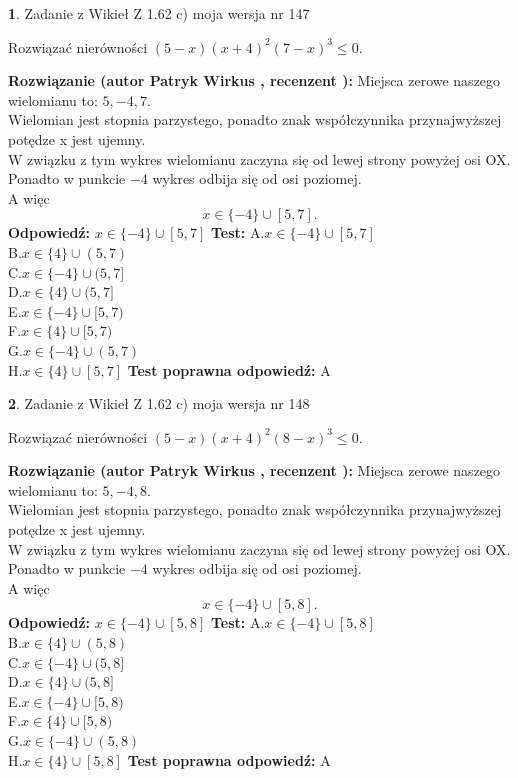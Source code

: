 \documentclass[12pt, a4paper]{article}
\theoremstyle{definition} %
\newtheorem{zad}{}
\newcommand{\zadStart}[1]{\begin{zad}#1\newline}
\newcommand{\zadStop}{\end{zad}}
\newcommand{\rozwStart}[2]{\noindent \textbf{Rozwiązanie (autor #1 , recenzent #2): }\newline}
\newcommand{\rozwStop}{\newline}
\newcommand{\odpStart}{\noindent \textbf{Odpowiedź:}\newline}
\newcommand{\odpStop}{\newline}
\newcommand{\testStart}{\noindent \textbf{Test:}\newline}
\newcommand{\testStop}{\newline}
\newcommand{\kluczStart}{\noindent \textbf{Test poprawna odpowiedź:}\newline}
\newcommand{\kluczStop}{\newline}
\begin{document}
\zadStart{Zadanie z Wikieł Z 1.62 c) moja wersja nr 147}

Rozwiązać nierówności $(5-x)(x+4)^{2}(7-x)^{3}\le0$.
\zadStop
\rozwStart{Patryk Wirkus}{}
Miejsca zerowe naszego wielomianu to: $5, -4, 7$.\\
Wielomian jest stopnia parzystego, ponadto znak współczynnika przy\linebreak najwyższej potędze x jest ujemny.\\ W związku z tym wykres wielomianu zaczyna się od lewej strony powyżej osi OX.\\
Ponadto w punkcie $-4$ wykres odbija się od osi poziomej.\\
A więc $$x \in \{-4\} \cup [5,7].$$
\rozwStop
\odpStart
$x \in \{-4\} \cup [5,7]$
\odpStop
\testStart
A.$x \in \{-4\} \cup [5,7]$\\
B.$x \in \{4\} \cup (5,7)$\\
C.$x \in \{-4\} \cup (5,7]$\\
D.$x \in \{4\} \cup (5,7]$\\
E.$x \in \{-4\} \cup [5,7)$\\
F.$x \in \{4\} \cup [5,7)$\\
G.$x \in \{-4\} \cup (5,7)$\\
H.$x \in \{4\} \cup [5,7]$
\testStop
\kluczStart
A
\kluczStop



\zadStart{Zadanie z Wikieł Z 1.62 c) moja wersja nr 148}

Rozwiązać nierówności $(5-x)(x+4)^{2}(8-x)^{3}\le0$.
\zadStop
\rozwStart{Patryk Wirkus}{}
Miejsca zerowe naszego wielomianu to: $5, -4, 8$.\\
Wielomian jest stopnia parzystego, ponadto znak współczynnika przy\linebreak najwyższej potędze x jest ujemny.\\ W związku z tym wykres wielomianu zaczyna się od lewej strony powyżej osi OX.\\
Ponadto w punkcie $-4$ wykres odbija się od osi poziomej.\\
A więc $$x \in \{-4\} \cup [5,8].$$
\rozwStop
\odpStart
$x \in \{-4\} \cup [5,8]$
\odpStop
\testStart
A.$x \in \{-4\} \cup [5,8]$\\
B.$x \in \{4\} \cup (5,8)$\\
C.$x \in \{-4\} \cup (5,8]$\\
D.$x \in \{4\} \cup (5,8]$\\
E.$x \in \{-4\} \cup [5,8)$\\
F.$x \in \{4\} \cup [5,8)$\\
G.$x \in \{-4\} \cup (5,8)$\\
H.$x \in \{4\} \cup [5,8]$
\testStop
\kluczStart
A
\kluczStop
\end{document}
